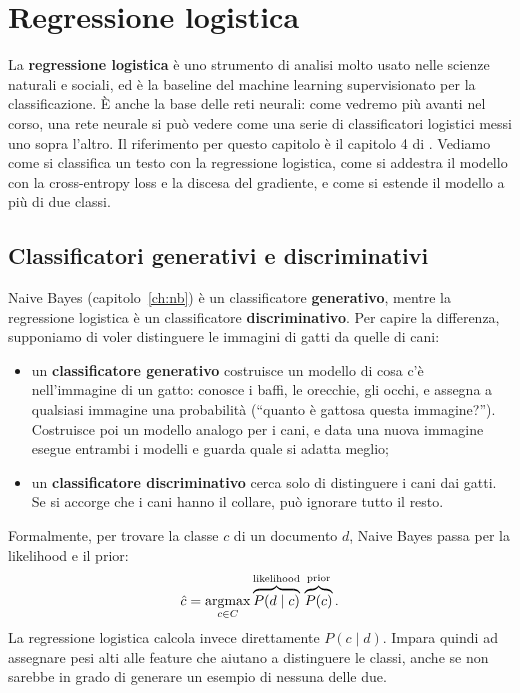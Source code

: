 \chapter{Regressione logistica}\label{ch:lr}
La \textbf{regressione logistica} è uno strumento di analisi molto usato nelle scienze naturali e sociali, ed è la baseline del machine learning supervisionato per la classificazione. È anche la base delle reti neurali: come vedremo più avanti nel corso, una rete neurale si può vedere come una serie di classificatori logistici messi uno sopra l'altro. Il riferimento per questo capitolo è il capitolo 4 di \cite{jurafsky2026slp}. Vediamo come si classifica un testo con la regressione logistica, come si addestra il modello con la cross-entropy loss e la discesa del gradiente, e come si estende il modello a più di due classi.

\section{Classificatori generativi e discriminativi}
Naive Bayes (capitolo~\ref{ch:nb}) è un classificatore \textbf{generativo}, mentre la regressione logistica è un classificatore \textbf{discriminativo}. Per capire la differenza, supponiamo di voler distinguere le immagini di gatti da quelle di cani:
\begin{itemize}
    \item un \textbf{classificatore generativo} costruisce un modello di cosa c'è nell'immagine di un gatto: conosce i baffi, le orecchie, gli occhi, e assegna a qualsiasi immagine una probabilità (\enquote{quanto è gattosa questa immagine?}). Costruisce poi un modello analogo per i cani, e data una nuova immagine esegue entrambi i modelli e guarda quale si adatta meglio;
    \item un \textbf{classificatore discriminativo} cerca solo di distinguere i cani dai gatti. Se si accorge che i cani hanno il collare, può ignorare tutto il resto.
\end{itemize}
Formalmente, per trovare la classe $c$ di un documento $d$, Naive Bayes passa per la likelihood e il prior:
\[
\hat{c} = \operatorname*{argmax}_{c \in C} \overbrace{P(d \mid c)}^{\text{likelihood}}\, \overbrace{P(c)}^{\text{prior}}.
\]
La regressione logistica calcola invece direttamente $P(c \mid d)$. Impara quindi ad assegnare pesi alti alle feature che aiutano a distinguere le classi, anche se non sarebbe in grado di generare un esempio di nessuna delle due.

